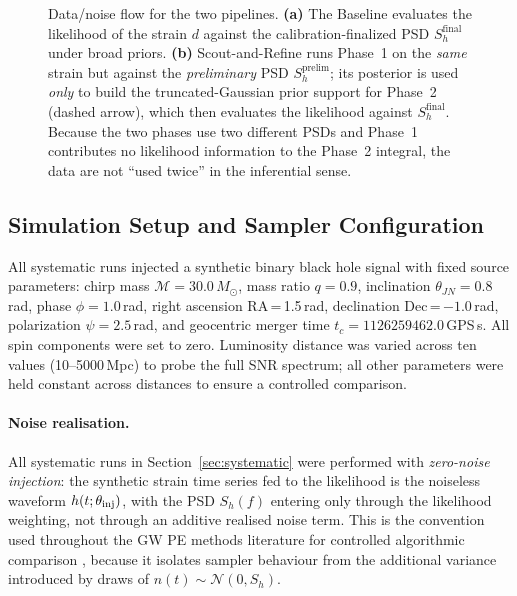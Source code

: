 \documentclass[12pt]{article}
\begin{document}
\begin{figure}[htbp]
\caption[Data and noise flow: Baseline vs.\ Scout-and-Refine.]{Data/noise flow for the two pipelines. \textbf{(a)} The Baseline evaluates the likelihood of the strain $d$ against the calibration-finalized PSD $S_h^{\mathrm{final}}$ under broad priors. \textbf{(b)} Scout-and-Refine runs Phase~1 on the \emph{same} strain but against the \emph{preliminary} PSD $S_h^{\mathrm{prelim}}$; its posterior is used \emph{only} to build the truncated-Gaussian prior support for Phase~2 (dashed arrow), which then evaluates the likelihood against $S_h^{\mathrm{final}}$. Because the two phases use two different PSDs and Phase~1 contributes no likelihood information to the Phase~2 integral, the data are not ``used twice'' in the inferential sense.}
\label{fig:algorithm}
\end{figure}

\subsection{Simulation Setup and Sampler Configuration}
\label{sec:implementation}

All systematic runs injected a synthetic binary black hole signal with fixed source parameters: chirp mass $\mathcal{M} = 30.0\,M_\odot$, mass ratio $q = 0.9$, inclination $\theta_{JN} = 0.8$\,rad, phase $\phi = 1.0$\,rad, right ascension RA\,=\,1.5\,rad, declination Dec\,=\,$-1.0$\,rad, polarization $\psi = 2.5$\,rad, and geocentric merger time $t_c = 1126259462.0$\,GPS\,s. All spin components were set to zero. Luminosity distance was varied across ten values (10--5000\,Mpc) to probe the full SNR spectrum; all other parameters were held constant across distances to ensure a controlled comparison.

\paragraph{Noise realisation.}
All systematic runs in Section~\ref{sec:systematic} were performed with \emph{zero-noise injection}: the synthetic strain time series fed to the likelihood is the noiseless waveform $h(t;\theta_{\rm inj})$, with the PSD $S_h(f)$ entering only through the likelihood weighting, not through an additive realised noise term. This is the convention used throughout the GW PE methods literature for controlled algorithmic comparison \cite{Veitch2015,Romero-Shaw2020,Smith2020}, because it isolates sampler behaviour from the additional variance introduced by draws of $n(t) \sim \mathcal{N}(0, S_h)$.
\end{document}

